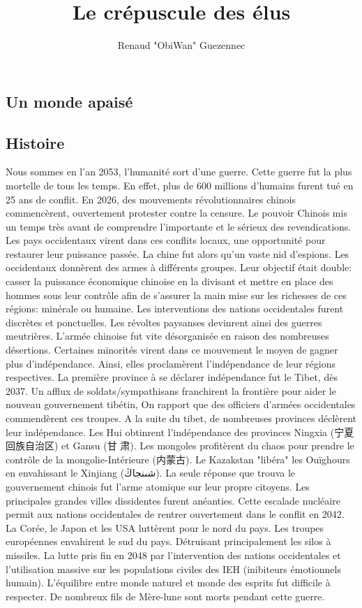 \documentclass[oneside,12pt]{book}
\title{Le crépuscule des élus}
\author{Renaud "ObiWan" Guezennec}
\date{}
\begin{document}
\maketitle \clearpage
\tableofcontents \clearpage

\begin{flushleft}
  \chapter{Un monde apaisé}
    \section{Histoire}
    Nous sommes en l'an 2053, l'humanité sort d'une guerre. Cette guerre fut la plus mortelle de tous les temps. 
En effet, plus de 600 millions d'humains furent tué en 25 ans de conflit. En 2026, des mouvements révolutionnaires chinois commencèrent, ouvertement 
protester contre la censure.
Le pouvoir Chinois mis un temps très avant de comprendre l'importante et le sérieux des revendications. 
Les pays occidentaux virent dans ces conflits locaux, une opportunité pour restaurer leur puissance passée. 
La chine fut alors qu'un vaste nid d'espions. 
Les occidentaux donnèrent des armes à différents groupes. 
Leur objectif était double: casser la puissance économique chinoise en la divisant et mettre en place des hommes sous leur contrôle afin de s'assurer la main mise sur les richesses de ces régions: minérale ou humaine. 
Les interventions des nations occidentales furent discrètes et ponctuelles. Les révoltes paysanses devinrent ainsi des guerres meutrières.
L'armée chinoise fut vite désorganisée en raison des nombreuses désertions. 
Certaines minorités virent dans ce mouvement le moyen de gagner plus d'indépendance. 
Ainsi, elles proclamèrent l'indépendance de leur régions respectives.
La première province à se déclarer indépendance fut le Tibet, dès 2037. Un afflux de soldats/sympathisans franchirent la frontière pour aider le nouveau gouvernement tibétin, On rapport que des officiers d'armées occidentales commendèrent ces troupes. A la suite du tibet, de nombreuses provinces déclèrent leur indépendance. 
Les Hui obtinrent l'indépendance des provinces Ningxia ({\CH 宁夏回族自治区}) et Gansu ({\CH 甘
肃}). 
Les mongoles profitèrent du chaos pour prendre le contrôle de la mongolie-Intérieure ({\CH 内蒙古}). 
Le Kazakstan "libéra" les Ouïghours en envahissant le Xinjiang ({\A شىنجاڭ}). 
La seule réponse que trouva le gouvernement chinois fut l'arme atomique sur leur propre citoyens. 
Les principales grandes villes dissidentes furent anéanties.
Cette escalade nucléaire permit aux nations occidentales de rentrer ouvertement dans le conflit en 2042.
La Corée, le Japon et les USA luttèrent pour le nord du pays. Les troupes européennes envahirent le sud du pays. Détruisant principalement les silos à missiles.
La lutte pris fin en 2048  par l'intervention des nations occidentales et l'utilisation massive sur les populations civiles des IEH (inibiteurs émotionnels humain).
 L'équilibre entre monde naturel et monde des esprits fut difficile à respecter. De nombreux fils de Mère-lune sont morts pendant cette guerre. 
\clearpage


\end{flushleft}
\end{document}
